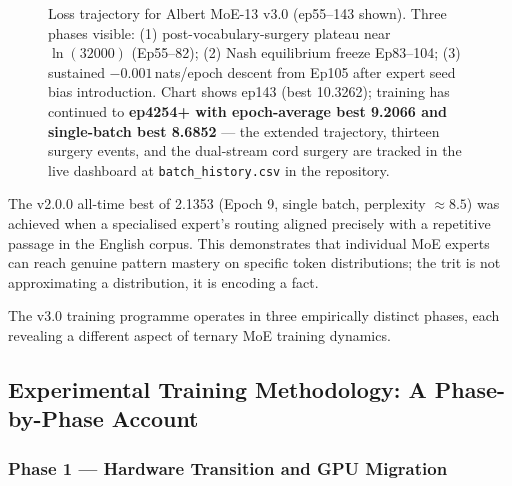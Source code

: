 \documentclass[11pt,a4paper]{article}
\begin{document}
\begin{figure}[htbp]
\caption{Loss trajectory for Albert MoE-13 v3.0 (ep55--143 shown). Three phases visible:
(1) post-vocabulary-surgery plateau near $\ln(32000)$ (Ep55--82); (2) Nash equilibrium
freeze Ep83--104; (3) sustained $-0.001$\,nats/epoch descent from Ep105 after expert seed
bias introduction. Chart shows ep143 (best 10.3262); training has continued to \textbf{ep4254+
with epoch-average best 9.2066 and single-batch best 8.6852} --- the extended trajectory,
thirteen surgery events, and the dual-stream cord surgery are tracked in the live dashboard at
\texttt{batch\_history.csv} in the repository.}
\label{fig:loss_curves}
\end{figure}

The v2.0.0 all-time best of 2.1353 (Epoch 9, single batch, perplexity $\approx 8.5$)
was achieved when a specialised expert's routing aligned precisely with a repetitive
passage in the English corpus. This demonstrates that individual MoE experts can
reach genuine pattern mastery on specific token distributions; the trit is not
approximating a distribution, it is encoding a fact.

The v3.0 training programme operates in three empirically distinct phases,
each revealing a different aspect of ternary MoE training dynamics.

\subsection{Experimental Training Methodology: A Phase-by-Phase Account}
\label{subsec:methodology}

\subsubsection{Phase 1 --- Hardware Transition and GPU Migration}
\label{subsubsec:phase1}
\end{document}
